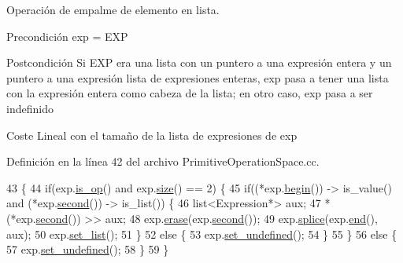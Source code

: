 Operación de empalme de elemento en lista. 

\begin{DoxyPrecond}{Precondición}
\textquotesingle{}exp\textquotesingle{} = \textquotesingle{}E\+XP\textquotesingle{} 
\end{DoxyPrecond}
\begin{DoxyPostcond}{Postcondición}
Si \textquotesingle{}E\+XP\textquotesingle{} era una lista con un puntero a una expresión entera y un puntero a una expresión lista de expresiones enteras, \textquotesingle{}exp\textquotesingle{} pasa a tener una lista con la expresión entera como cabeza de la lista; en otro caso, \textquotesingle{}exp\textquotesingle{} pasa a ser indefinido 
\end{DoxyPostcond}
\begin{DoxyParagraph}{Coste}
Lineal con el tamaño de la lista de expresiones de \textquotesingle{}exp\textquotesingle{} 
\end{DoxyParagraph}


Definición en la línea 42 del archivo Primitive\+Operation\+Space.\+cc.


\begin{DoxyCode}
43 \{
44   \textcolor{keywordflow}{if}(exp.\hyperlink{class_expression_a422fb496720b177eaed37a9694613384}{is\_op}() and exp.\hyperlink{class_expression_a0e8980139631cf7bc9fd3bca9d8caddc}{size}() == 2) \{
45     \textcolor{keywordflow}{if}((*exp.\hyperlink{class_expression_a0ed7767d72f93c9121bb73afead5782a}{begin}()) -> is\_value() and (*exp.\hyperlink{class_expression_ae53f7febf676d564d6393bf2762fc08e}{second}()) -> is\_list()) \{
46       list<Expression*> aux;
47       *(*exp.\hyperlink{class_expression_ae53f7febf676d564d6393bf2762fc08e}{second}()) >> aux;
48       exp.\hyperlink{class_expression_a3fcf4ce4c5efde7795a6b3b004abf0ad}{erase}(exp.\hyperlink{class_expression_ae53f7febf676d564d6393bf2762fc08e}{second}());
49       exp.\hyperlink{class_expression_afcd885fc3562809ede2796b722bb4854}{splice}(exp.\hyperlink{class_expression_af5229aaf6bbb7200db55f220f315192e}{end}(), aux);
50       exp.\hyperlink{class_expression_a66db516be4fa87d58df4806938676508}{set\_list}();
51     \}
52     \textcolor{keywordflow}{else} \{
53       exp.\hyperlink{class_expression_a1d3ddfe83d20f47930792807e8b22248}{set\_undefined}();
54     \}
55   \}
56   \textcolor{keywordflow}{else} \{
57     exp.\hyperlink{class_expression_a1d3ddfe83d20f47930792807e8b22248}{set\_undefined}();
58   \}
59 \}
\end{DoxyCode}
